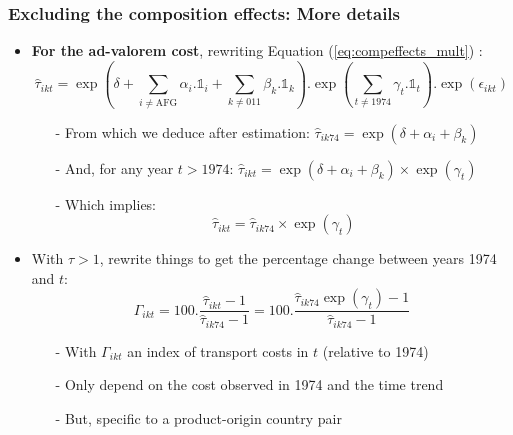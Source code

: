 \documentclass[10 pt,Helvetica, french]{beamer}
\begin{document}
\begin{frame}[label=app_compeffects]
\frametitle{Excluding the composition effects: More details}
\begin{itemize}
\item \textbf{For the ad-valorem cost}, rewriting Equation (\ref{eq:compeffects_mult}) :
\footnotesize
\begin{equation*}
\widehat{\tau}_{ikt}=\exp\left(\delta + \sum_{i \neq \text{AFG}}\alpha_i.\mathbb{1}_i+\sum_{k\neq \text{011}}\beta_k.\mathbb{1}_k\right).\exp\left(\sum_{t \neq 1974}\gamma_t.\mathbb{1}_t\right) .\exp\left(\epsilon_{ikt}\right)
\end{equation*}
\normalsize
\begin{itemize}
\item[-] From which we deduce after estimation: $\widehat{\tau}_{ik74} = \exp(\delta +\alpha_i +\beta_k)$ \vspace{0.1cm}
\item[-] And, for any year $t > 1974$: $\widehat{\tau}_{ikt} = \exp(\delta +\alpha_i +\beta_k)\times \exp(\gamma_t)$ \vspace{0.1cm}
\item[-] Which implies:
\begin{equation*}
\widehat{\tau}_{ikt} = \widehat{\tau}_{ik74}\times \exp(\gamma_t)
\end{equation*}
\end{itemize}
\item With $\tau>1$, rewrite things to get the percentage change between years 1974 and $t$:
\footnotesize
$$\Gamma_{ikt} = 100.\frac{\widehat{\tau}_{ikt}-1}{\widehat{\tau}_{ik74}-1} = 100.\frac{\widehat{\tau}_{ik74}\exp(\gamma_t)-1}{\widehat{\tau}_{ik74}-1}$$
\normalsize
\begin{itemize}
\item[-] With $\Gamma_{ikt}$ an index of transport costs in $t$ (relative to 1974) \vspace{0.1cm}
\item[-] Only depend on the cost observed in 1974 and the time trend \vspace{0.1cm}
\item[-] But, specific to a product-origin country pair  \vspace{0.1cm}

\end{itemize}
\end{itemize}
\end{frame}
\end{document}
